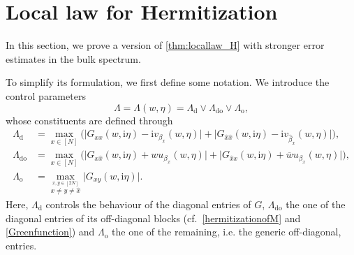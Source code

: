 \documentclass[10pt,a4paper]{amsart}
\newcommand{\ii}{\mathrm{i}}
\newcommand{\absb}[1]{\bigl| #1 \bigr|}
\numberwithin{equation}{section}
\newcommand*\ubarr[1]{{\widehat{#1}}}
\begin{document}
	
	

	

		\section{Local law for Hermitization}  \label{section:proof_local_law_H} 
		
	In this section, we prove a version of \cref{thm:locallaw_H} with stronger error estimates in the bulk spectrum. 
	
	To simplify its formulation, we first define some notation. We introduce the control parameters
	\begin{equation}\label{eq:def_Lambda}
		\Lambda = \Lambda(w,\eta) = \Lambda_{\mathrm{d}} \vee \Lambda_{\mathrm{do}} \vee \Lambda_{\mathrm{o}}, 
	\end{equation}
whose constituents are defined through 
	\begin{align*}
		\Lambda_{\mathrm{d}} &= \max_{x \in [N]} \Big( \absb{G_{xx}(w,\ii \eta) - \ii v_{\beta_x}(w,\eta)} +
		\absb{G_{\ubarr{x}\ubarr{x}}(w,\ii \eta) - \ii v_{\ubarr{\beta}_x}(w,\eta)}
		\Big),\\
		\Lambda_{\mathrm{do}} &= \max_{x \in [N]} \Big( 
		\absb{G_{x\ubarr{x}}(w,\ii\eta) + w u_{\beta_x}(w,\eta)} 
		+ \absb{G_{\ubarr{x}x}(w,\ii\eta) + \overline{w} u_{{\beta}_x}(w,\eta)} \Big), \\
		\Lambda_{\mathrm{o}} &=\max_{\stackrel{x,y \in [2N]}{x \neq y \neq \ubarr{x}}}\absb{G_{xy}(w, \ii \eta)}.
	\end{align*}
	Here, $\Lambda_{\mathrm{d}}$ controls the behaviour of the diagonal entries of $G$, $\Lambda_{\mathrm{do}}$ the one of the diagonal entries of its off-diagonal blocks (cf.\  \eqref{hermitizationofM} and \eqref{Greenfunction}) and $\Lambda_{\mathrm{o}}$ the one of the remaining, i.e.
	the generic off-diagonal, entries.
	
\end{document}
